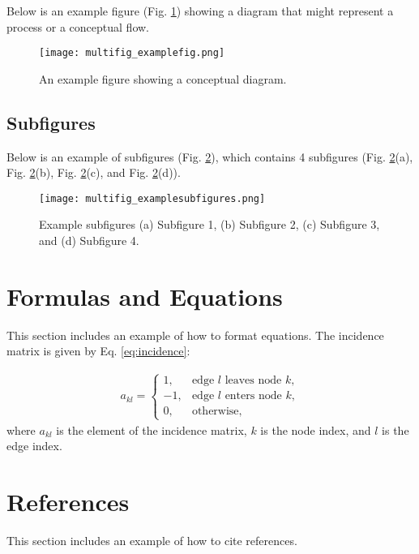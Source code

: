 \documentclass[a4paper]{book}
\begin{document}
Below is an example figure (Fig. \ref{multifig:multifig_examplefig}) showing a diagram that might represent a process or a conceptual flow.


\begin{figure}[htbp]
    \centering
    \texttt{[image: multifig\_examplefig.png]}
    \caption{
        An example figure showing a conceptual diagram.
    }
    \label{multifig:multifig_examplefig}
\end{figure}


\subsection{Subfigures}

Below is an example of subfigures (Fig. \ref{multifig:multifig_examplesubfigures}), which contains 4 subfigures (Fig. \ref{multifig:multifig_examplesubfigures}(a), Fig. \ref{multifig:multifig_examplesubfigures}(b), Fig. \ref{multifig:multifig_examplesubfigures}(c), and Fig. \ref{multifig:multifig_examplesubfigures}(d)).


\begin{figure}[htbp]
    \centering
    \texttt{[image: multifig\_examplesubfigures.png]}
    \caption{
        Example subfigures (a) Subfigure 1, (b) Subfigure 2, (c) Subfigure 3, and (d) Subfigure 4.
    }
    \label{multifig:multifig_examplesubfigures}
\end{figure}


\section{Formulas and Equations}

This section includes an example of how to format equations. The incidence matrix is given by Eq. \ref{eq:incidence}:

\begin{align}\label{eq:incidence}
    a_{kl}=
    \begin{cases}
        1,  & \text{edge $l$ leaves node $k$},\\
        -1, & \text{edge $l$ enters node $k$},\\
        0,  & \text{otherwise},
    \end{cases}
\end{align}
where $a_{kl}$ is the element of the incidence matrix, $k$ is the node index, and $l$ is the edge index.

\section{References}

This section includes an example of how to cite references\cite{article1}.



\end{document}
